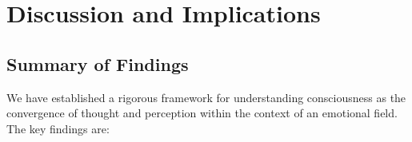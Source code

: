 \documentclass[11pt,a4paper]{article}
\begin{document}









\section{Discussion and Implications}

\subsection{Summary of Findings}

We have established a rigorous framework for understanding consciousness as the convergence of thought and perception within the context of an emotional field. The key findings are:
\end{document}
